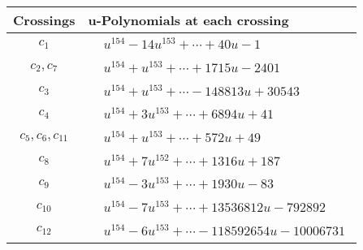 \documentclass[1p]{elsarticle_modified}
\theoremstyle{definition}
\begin{document}
\begin{tabular}{m{50pt}|m{274pt}}
Crossings & \hspace{64pt}u-Polynomials at each crossing \\
\hline $$\begin{aligned}c_{1}\end{aligned}$$&$\begin{aligned}
&u^{154}-14 u^{153}+\cdots+40 u-1
\end{aligned}$\\
\hline $$\begin{aligned}c_{2},c_{7}\end{aligned}$$&$\begin{aligned}
&u^{154}+u^{153}+\cdots+1715 u-2401
\end{aligned}$\\
\hline $$\begin{aligned}c_{3}\end{aligned}$$&$\begin{aligned}
&u^{154}+u^{153}+\cdots-148813 u+30543
\end{aligned}$\\
\hline $$\begin{aligned}c_{4}\end{aligned}$$&$\begin{aligned}
&u^{154}+3 u^{153}+\cdots+6894 u+41
\end{aligned}$\\
\hline $$\begin{aligned}c_{5},c_{6},c_{11}\end{aligned}$$&$\begin{aligned}
&u^{154}+u^{153}+\cdots+572 u+49
\end{aligned}$\\
\hline $$\begin{aligned}c_{8}\end{aligned}$$&$\begin{aligned}
&u^{154}+7 u^{152}+\cdots+1316 u+187
\end{aligned}$\\
\hline $$\begin{aligned}c_{9}\end{aligned}$$&$\begin{aligned}
&u^{154}-3 u^{153}+\cdots+1930 u-83
\end{aligned}$\\
\hline $$\begin{aligned}c_{10}\end{aligned}$$&$\begin{aligned}
&u^{154}-7 u^{153}+\cdots+13536812 u-792892
\end{aligned}$\\
\hline $$\begin{aligned}c_{12}\end{aligned}$$&$\begin{aligned}
&u^{154}-6 u^{153}+\cdots-118592654 u-10006731
\end{aligned}$\\
\hline
\end{tabular}\\~\\
\end{document}
